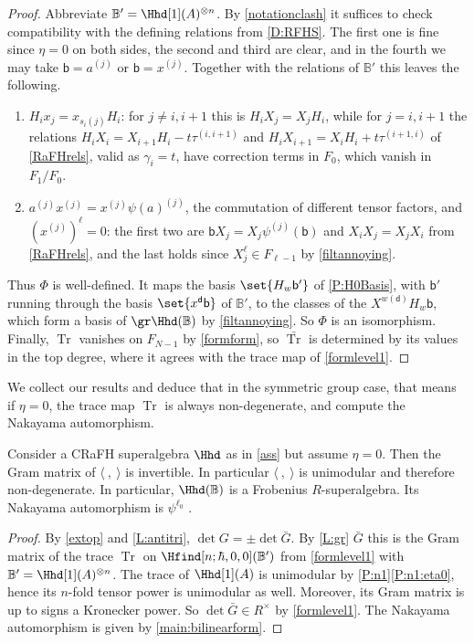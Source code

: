 \documentclass[a4paper,11pt]{amsart}
\let\<\langle
\let\>\rangle
\newcommand{\Tr}{\op{Tr}}
\numberwithin{equation}{subsection}
\theoremstyle{definition}
\theoremstyle{theorem}
\theoremstyle{remark}
\newcommand\bd{\mathsf{d}}
\newcommand\bb{\mathsf{b}}
\newcommand\op{\operatorname}
\newcommand{\Bo}{\mathbb{B}}
\begin{document}
\begin{proof}Abbreviate $\Bo'=\Hhd[1](A)^{\otimes n}$. By \autoref{notationclash} it suffices to
check compatibility with the defining relations from \autoref{D:RFHS}. The first one is fine since
$\eta=0$ on both sides, the second and third are clear, and in the fourth we may take
$\bb=a^{(j)}$ or $\bb=x^{(j)}$. Together with the relations of $\Bo'$ this leaves the following.
\begin{enumerate}
\item\label{Tee1} $H_ix_j=x_{s_i(j)}H_i$: for $j\not=i,i+1$ this is $H_iX_j=X_jH_i$, while for
$j=i,i+1$ the relations $H_iX_i=X_{i+1}H_i-t\tau^{(i,i+1)}$ and
$H_iX_{i+1}=X_iH_i+t\tau^{(i+1,i)}$ of \autoref{RaFHrels}, valid as $\gamma_i=t$, have
correction terms in $F_0$, which vanish in $F_1/F_0$.
\item\label{Tee2} $a^{(j)}x^{(j)}=x^{(j)}\psi(a)^{(j)}$, the commutation of different tensor
factors, and $(x^{(j)})^{\ell}=0$: the first two are $\bb X_j=X_j\psi^{(j)}(\bb)$ and
$X_iX_j=X_jX_i$ from \autoref{RaFHrels}, and the last holds since $X_j^{\ell}\in F_{\ell-1}$ by
\autoref{filtannoying}.
\end{enumerate}
Thus $\Phi$ is well-defined. It maps the basis $\set{H_w\bb'}$ of \autoref{P:H0Basis}, with
$\bb'$ running through the basis $\set{x^\bd\bb}$ of $\Bo'$, to the classes of the
$X^{w(\bd)}H_w\bb$, which form a basis of $\gr\Hhd(\Bo)$ by \autoref{filtannoying}. So $\Phi$ is
an isomorphism. Finally, $\Tr$ vanishes on $F_{N-1}$ by \autoref{formform}, so $\bar{\Tr}$ is
determined by its values in the top degree, where it agrees with the trace map of
\autoref{formlevel1}.
\end{proof}

We collect our results  and deduce that in the symmetric group case, that means if $\eta=0$, the  trace map $\Tr$ is always non-degenerate, and compute the Nakayama automorphism.
\begin{Theorem}\label{T:nondeg}
  Consider a CRaFH superalgebra  $\Hhd$ as in \autoref{ass} but assume $\eta=0$. Then the Gram matrix of $\<\ ,\ \>$  is invertible. In particular  $\<\ ,\ \>$ is unimodular and therefore non-degenerate. In particular, $\Hhd(\Bo)$ is a Frobenius
  $R$-superalgebra. Its Nakayama automorphism is $\psi^{\ell_0}$ .
\end{Theorem}

\begin{proof}
  By \autoref{extop} and \autoref{L:antitri}, $\det G=\pm\det\bar G$. By \autoref{L:gr} $\bar G$ this is the Gram matrix of the trace $\Tr$ on $\Hfind[n;\hbar,0,0](\Bo')$ from \autoref{formlevel1}  with $\Bo'=\Hhd[1](A)^{\otimes n}$. The trace of $\Hhd[1](A)$ is unimodular by \autoref{P:n1}\autoref{P:n1:eta0}, hence its $n$-fold tensor power is unimodular as well. Moreover, its Gram matrix is up to signs a Kronecker power. So $\det\bar G\in R^{\times}$ by \autoref{formlevel1}. The Nakayama automorphism is given by \autoref{main:bilinearform}.
\end{proof}
\end{document}
